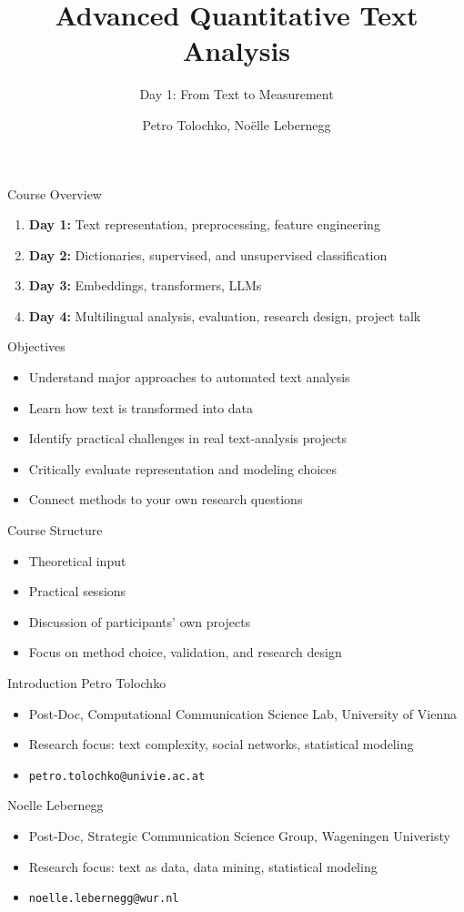 \documentclass[11pt,aspectratio=43]{beamer}
\title{Advanced Quantitative Text Analysis}
\subtitle{Day 1: From Text to Measurement}
\author{Petro Tolochko, Noëlle Lebernegg}
\date{}
\begin{document}
\begin{frame}
  \titlepage
\end{frame}

\begin{frame}{Course Overview}
\begin{enumerate}
\item \textbf{Day 1:} Text representation, preprocessing, feature engineering
\item \textbf{Day 2:} Dictionaries, supervised, and unsupervised classification
\item \textbf{Day 3:} Embeddings, transformers, LLMs
\item \textbf{Day 4:} Multilingual analysis, evaluation, research design, project talk
\end{enumerate}
\end{frame}

\begin{frame}{Objectives}
\begin{itemize}
\item Understand major approaches to automated text analysis
\item Learn how text is transformed into data
\item Identify practical challenges in real text-analysis projects
\item Critically evaluate representation and modeling choices
\item Connect methods to your own research questions
\end{itemize}
\end{frame}

\begin{frame}{Course Structure}
\begin{itemize}
\item Theoretical input
\item Practical sessions
\item Discussion of participants' own projects
\item Focus on method choice, validation, and research design
\end{itemize}
\end{frame}

\begin{frame}{Introduction}
Petro Tolochko
\begin{itemize}
\item Post-Doc, Computational Communication Science Lab, University of Vienna
\item Research focus: text complexity, social networks, statistical modeling
\item \texttt{petro.tolochko@univie.ac.at}
\end{itemize}
\vspace{1em}
Noelle Lebernegg
\begin{itemize}
\item Post-Doc, Strategic Communication Science Group, Wageningen Univeristy
\item Research focus: text as data, data mining, statistical modeling
\item \texttt{noelle.lebernegg@wur.nl}
\end{itemize}
\end{frame}
\end{document}
